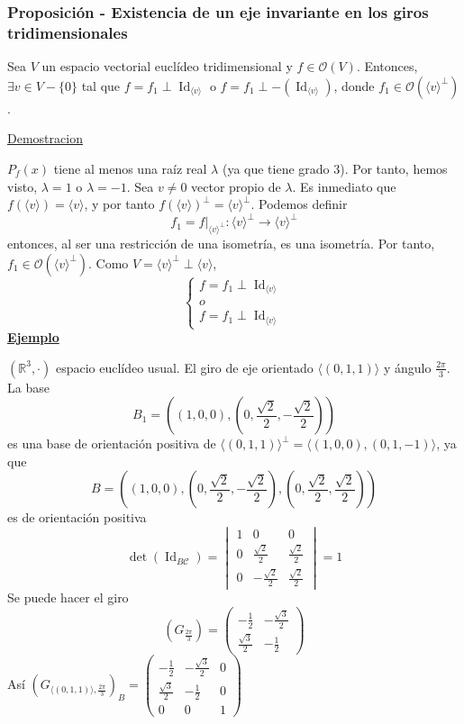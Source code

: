 \documentclass[12pt, a4paper, ones, notitlepage, openany,titlepage]{article}
\newcommand{\ejemplo}{\noindent\underline{\textbf{Ejemplo}}}
\begin{document}
\subsubsection{Proposición - Existencia de un eje invariante en los giros tridimensionales}
Sea $V$ un espacio vectorial euclídeo tridimensional y $f \in \mathcal{O}(V)$. Entonces, $\exists v \in V - \{0\}$ tal que $f = f_1 \perp \operatorname{Id}_{\langle v \rangle}$ o $f = f_1 \perp -(\operatorname{Id}_{\langle v \rangle})$, donde $f_1 \in \mathcal{O}(\langle v \rangle^\perp)$.

\noindent\underline{Demostracion}

$P_f(x)$ tiene al menos una raíz real $\lambda$ (ya que tiene grado $3$). Por tanto, hemos visto, $\lambda = 1$ o $\lambda = -1$. Sea $v \neq 0$ vector propio de $\lambda$. Es inmediato que $f(\langle v \rangle) = \langle v \rangle$, y por tanto $f(\langle v \rangle)^\perp = \langle v \rangle^\perp$. Podemos definir
$$
f_1 = f|_{\langle v \rangle^\perp} : \langle v \rangle^\perp \longrightarrow \langle v \rangle^\perp
$$
entonces, al ser una restricción de una isometría, es una isometría. Por tanto, $f_1 \in \mathcal{O}(\langle v \rangle^\perp)$. Como $V = \langle v \rangle^\perp \perp \langle v \rangle$,
$$\begin{cases}
	f = f_1 \perp \operatorname{Id}_{\langle v \rangle} \\
	o \\
	f = f_1 \perp \operatorname{Id}_{\langle v \rangle}
\end{cases}
$$
\ejemplo

\noindent $(\mathbb{R}^3, \cdot)$ espacio euclídeo usual. El giro de eje orientado $\langle (0, 1, 1) \rangle$ y ángulo $\displaystyle \frac{2\pi}{3}$. La base 
$$
\displaystyle B_1 = \left(\left(1,0,0\right),\left(0, \frac{\sqrt{2}}{2},-\frac{\sqrt{2}}{2}\right)\right)
$$
es una base de orientación positiva de $\langle(0,1,1)\rangle^\perp = \langle (1,0,0),(0,1,-1)\rangle$, ya que 
$$
B = \left(\left(1,0,0\right),\left(0, \frac{\sqrt{2}}{2},-\frac{\sqrt{2}}{2}\right),\left(0, \frac{\sqrt{2}}{2},\frac{\sqrt{2}}{2}\right)\right)
$$
es de orientación positiva
$$
\det\left(\operatorname{Id}_{B\mathcal{C}}\right) = \begin{vmatrix}
	1 & 0 & 0 \\
	0 & \frac{\sqrt{2}}{2} & \frac{\sqrt{2}}{2} \\
	0 & -\frac{\sqrt{2}}{2} & \frac{\sqrt{2}}{2}
\end{vmatrix} = 1
$$
Se puede hacer el giro
$$
\left(G_{\frac{2\pi}{3}}\right) = \begin{pmatrix}
	-\frac{1}{2} & -\frac{\sqrt{3}}{2} \\
	\frac{\sqrt{3}}{2} & -\frac{1}{2}
\end{pmatrix}
$$
Así
$\left(G_{\langle (0,1,1) \rangle, \frac{2\pi}{3}}\right)_B = \begin{pmatrix}
	-\frac{1}{2} & -\frac{\sqrt{3}}{2} & 0 \\
	\frac{\sqrt{3}}{2} & -\frac{1}{2} & 0 \\
	0 & 0 & 1
\end{pmatrix}$
\end{document}
